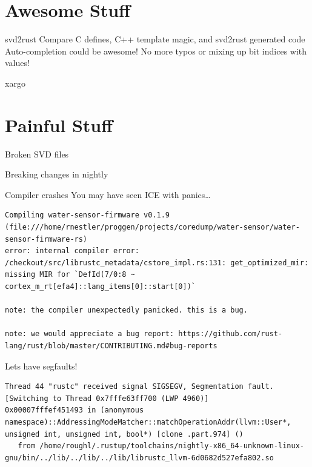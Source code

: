 \documentclass[aspectratio=1610,14pt,t]{beamer}
\begin{document}
\section{Awesome Stuff}

\begin{frame}[c]{svd2rust}
  Compare C defines, C++ template magic, and svd2rust generated code
  Auto-completion could be awesome!
  No more typos or mixing up bit indices with values!
\end{frame}

\begin{frame}[c]{xargo}
\end{frame}

\section{Painful Stuff}

\begin{frame}[c]{Broken SVD files}
\end{frame}

\begin{frame}[c]{Breaking changes in nightly}
\end{frame}

\begin{frame}[c,fragile]{Compiler crashes}
  You may have seen ICE with panics\ldots

  \begin{verbatim}
Compiling water-sensor-firmware v0.1.9 (file:///home/rnestler/proggen/projects/coredump/water-sensor/water-sensor-firmware-rs)
error: internal compiler error: /checkout/src/librustc_metadata/cstore_impl.rs:131: get_optimized_mir: missing MIR for `DefId(7/0:8 ~ cortex_m_rt[efa4]::lang_items[0]::start[0])`

note: the compiler unexpectedly panicked. this is a bug.

note: we would appreciate a bug report: https://github.com/rust-lang/rust/blob/master/CONTRIBUTING.md#bug-reports
  \end{verbatim}
\end{frame}

\begin{frame}[c,fragile]{Lets have segfaults!}
  \begin{verbatim}
Thread 44 "rustc" received signal SIGSEGV, Segmentation fault.
[Switching to Thread 0x7fffe63ff700 (LWP 4960)]
0x00007fffef451493 in (anonymous namespace)::AddressingModeMatcher::matchOperationAddr(llvm::User*, unsigned int, unsigned int, bool*) [clone .part.974] ()
   from /home/roughl/.rustup/toolchains/nightly-x86_64-unknown-linux-gnu/bin/../lib/../lib/../lib/librustc_llvm-6d0682d527efa802.so
  \end{verbatim}
\end{frame}
\end{document}
